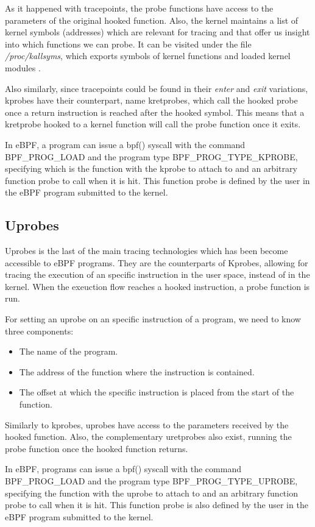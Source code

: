 As it happened with tracepoints, the probe functions have access to the parameters of the original hooked function. Also, the kernel maintains a list of kernel symbols (addresses) which are relevant for tracing and that offer us insight into which functions we can probe. It can be visited under the file \textit{/proc/kallsyms}, which exports symbols of kernel functions and loaded kernel modules \cite{kallsyms_kernel}.

Also similarly, since tracepoints could be found in their \textit{enter} and \textit{exit} variations, kprobes have their counterpart, name kretprobes, which call the hooked probe once a return instruction is reached after the hooked symbol. This means that a kretprobe hooked to a kernel function will call the probe function once it exits.

In eBPF, a program can issue a bpf() syscall with the command BPF\_PROG\_LOAD and the program type BPF\_PROG\_TYPE\_KPROBE, specifying which is the function with the kprobe to attach to and an arbitrary function probe to call when it is hit. This function probe is defined by the user in the eBPF program submitted to the kernel.

\subsection{Uprobes}
Uprobes is the last of the main tracing technologies which has been become accessible to eBPF programs. They are the counterparts of Kprobes, allowing for tracing the execution of an specific instruction in the user space, instead of in the kernel. When the exeuction flow reaches a hooked instruction, a probe function is run. 

For setting an uprobe on an specific instruction of a program, we need to know three components:
\begin{itemize}
\item The name of the program.
\item The address of the function where the instruction is contained.
\item The offset at which the specific instruction is placed from the start of the function.
\end{itemize}

Similarly to kprobes, uprobes have access to the parameters received by the hooked function. Also, the complementary uretprobes also exist, running the probe function once the hooked function returns.

In eBPF, programs can issue a bpf() syscall with the command BPF\_PROG\_LOAD and the program type BPF\_PROG\_TYPE\_UPROBE, specifying the function with the uprobe to attach to and an arbitrary function probe to call when it is hit. This function probe is also defined by the user in the eBPF program submitted to the kernel.

